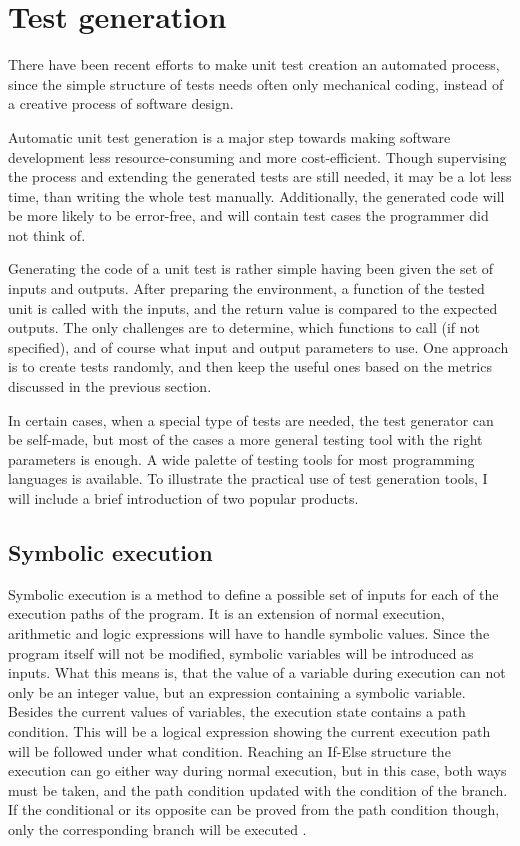 \section{Test generation}

There have been recent efforts to make unit test creation an automated process, since the simple structure of tests needs often only mechanical coding, instead of a creative process of software design. 

Automatic unit test generation is a major step towards making software development less resource-consuming and more cost-efficient. Though supervising the process and extending the generated tests are still needed, it may be a lot less time, than writing the whole test manually. Additionally, the generated code will be more likely to be error-free, and will contain test cases the programmer did not think of.

Generating the code of a unit test is rather simple having been given the set of inputs and outputs. After preparing the environment, a function of the tested unit is called with the inputs, and the return value is compared to the expected outputs. The only challenges are to determine, which functions to call (if not specified), and of course what input and output parameters to use. One approach is to create tests randomly, and then keep the useful ones based on the metrics discussed in the previous section.

In certain cases, when a special type of tests are needed, the test generator can be self-made, but most of the cases a more general testing tool with the right parameters is enough. A wide palette of testing tools for most programming languages is available. To illustrate the practical use of test generation tools, I will include a brief introduction of two popular products.


\subsection{Symbolic execution}

Symbolic execution is a method to define a possible set of inputs for each of the execution paths of the program. It is an extension of normal execution, arithmetic and logic expressions will have to handle symbolic values. Since the program itself will not be modified, symbolic variables will be introduced as inputs. What this means is, that the value of a variable during execution can not only be an integer value, but an expression containing a symbolic variable.
Besides the current values of variables, the execution state contains a path condition. This will be a logical expression showing the current execution path will be followed under what condition. Reaching an If-Else structure the execution can go either way during normal execution, but in this case, both ways must be taken, and the path condition updated with the condition of the branch. If the conditional or its opposite can be proved from the path condition though, only the corresponding branch will be executed \cite{King:1976:SEP:360248.360252}. 

